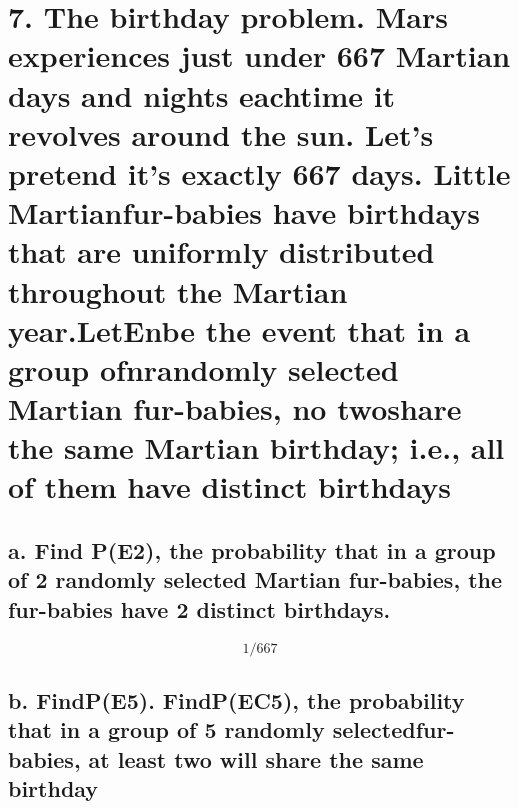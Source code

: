 \documentclass[
]{article}
\begin{document}
\hypertarget{the-birthday-problem.-mars-experiences-just-under-667-martian-days-and-nights-eachtime-it-revolves-around-the-sun.-lets-pretend-its-exactly-667-days.-little-martianfur-babies-have-birthdays-that-are-uniformly-distributed-throughout-the-martian-year.letenbe-the-event-that-in-a-group-ofnrandomly-selected-martian-fur-babies-no-twoshare-the-same-martian-birthday-i.e.-all-of-them-have-distinct-birthdays}{%
\section{7. The birthday problem. Mars experiences just under 667
Martian days and nights eachtime it revolves around the sun. Let's
pretend it's exactly 667 days. Little Martianfur-babies have birthdays
that are uniformly distributed throughout the Martian year.LetEnbe the
event that in a group ofnrandomly selected Martian fur-babies, no
twoshare the same Martian birthday; i.e., all of them have distinct
birthdays}\label{the-birthday-problem.-mars-experiences-just-under-667-martian-days-and-nights-eachtime-it-revolves-around-the-sun.-lets-pretend-its-exactly-667-days.-little-martianfur-babies-have-birthdays-that-are-uniformly-distributed-throughout-the-martian-year.letenbe-the-event-that-in-a-group-ofnrandomly-selected-martian-fur-babies-no-twoshare-the-same-martian-birthday-i.e.-all-of-them-have-distinct-birthdays}}

\hypertarget{a.-find-pe2-the-probability-that-in-a-group-of-2-randomly-selected-martian-fur-babies-the-fur-babies-have-2-distinct-birthdays.}{%
\subsection{a. Find P(E2), the probability that in a group of 2 randomly
selected Martian fur-babies, the fur-babies have 2 distinct
birthdays.}\label{a.-find-pe2-the-probability-that-in-a-group-of-2-randomly-selected-martian-fur-babies-the-fur-babies-have-2-distinct-birthdays.}}

\[
1/667
\]

\hypertarget{b.-findpe5.-findpec5-the-probability-that-in-a-group-of-5-randomly-selectedfur-babies-at-least-two-will-share-the-same-birthday}{%
\subsection{b. FindP(E5). FindP(EC5), the probability that in a group of
5 randomly selectedfur-babies, at least two will share the same
birthday}\label{b.-findpe5.-findpec5-the-probability-that-in-a-group-of-5-randomly-selectedfur-babies-at-least-two-will-share-the-same-birthday}}
\end{document}
